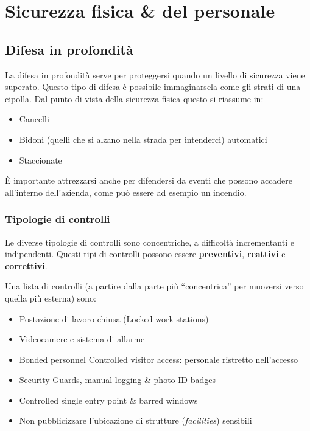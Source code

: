 \part{Sicurezza fisica \& del personale}
\label{SFDP}
\chapter{Difesa in profondità}

La difesa in profondità serve per proteggersi quando un livello di sicurezza 
viene superato. Questo tipo di difesa è possibile immaginarsela come gli strati 
di una cipolla. Dal punto di vista della sicurezza fisica questo si riassume in:
\begin{itemize}
\item Cancelli
\item Bidoni (quelli che si alzano nella strada per intenderci) automatici
\item Staccionate
\end{itemize}

È importante attrezzarsi anche per difendersi da eventi che possono accadere 
all'interno dell'azienda, come può essere ad esempio un incendio.

\section{Tipologie di controlli}

Le diverse tipologie di controlli sono concentriche, a difficoltà incrementanti e 
indipendenti. Questi tipi di controlli possono essere \textbf{preventivi}, 
\textbf{reattivi} e \textbf{correttivi}.

Una lista di controlli (a partire dalla parte più ``concentrica'' per muoversi 
verso quella più esterna) sono:

\begin{itemize}
\item Postazione di lavoro chiusa (Locked work stations)
\item Videocamere e sistema di allarme
\item Bonded personnel Controlled visitor access: personale ristretto 
nell'accesso
\item Security Guards, manual logging \& photo ID badges
\item Controlled single entry point \& barred windows
\item Non pubblicizzare l'ubicazione di strutture (\textit{facilities})
sensibili
\end{itemize}



